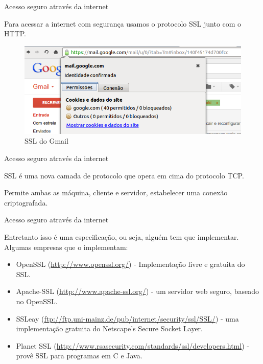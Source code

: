 \begin{frame}{Acesso seguro através da internet}

Para acessar a internet com segurança usamos o protocolo SSL junto com o
HTTP.

\begin{figure}
    \includegraphics[scale=0.4]{img/gmail-ssl.png}
    \caption{SSL do Gmail}
\end{figure}

\end{frame}

\begin{frame}{Acesso seguro através da internet}

SSL é uma nova camada de protocolo que opera em cima do protocolo TCP.

Permite ambas as máquina, cliente e servidor, estabelecer uma conexão
criptografada.

\end{frame}

\begin{frame}{Acesso seguro através da internet}

Entretanto isso é uma especificação, ou seja, alguém tem que
implementar. Algumas empresas que o implementam:

\begin{itemize}
\itemsep1pt\parskip0pt
\item
  OpenSSL (\href{openssl.org}{http://www.openssl.org/}) - Implementação
  livre e gratuita do SSL.
\item
  Apache-SSL (\href{apache-ssl.org}{http://www.apache-ssl.org/}) - um
  servidor web seguro, baseado no OpenSSL.
\item
  SSLeay (\url{ftp://ftp.uni-mainz.de/pub/internet/security/ssl/SSL/}) -
  uma implementação gratuita do Netscape's Secure Socket Layer.
\item
  Planet SSL
  (\url{http://www.rsasecurity.com/standards/ssl/developers.html}) -
  provê SSL para programas em C e Java.
\end{itemize}

\end{frame}

